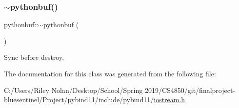 \mbox{\label{classpythonbuf_a3f1ff4b8d6c45c702a64251a0212a79c}} 
\subsubsection{\texorpdfstring{$\sim$pythonbuf()}{~pythonbuf()}}
{\footnotesize\ttfamily pythonbuf\+::$\sim$pythonbuf (\begin{DoxyParamCaption}{ }\end{DoxyParamCaption})\hspace{0.3cm}{\ttfamily [inline]}}



Sync before destroy. 



The documentation for this class was generated from the following file\+:\begin{DoxyCompactItemize}
\item 
C\+:/\+Users/\+Riley Nolan/\+Desktop/\+School/\+Spring 2019/\+C\+S4850/git/finalproject-\/bluesentinel/\+Project/pybind11/include/pybind11/\mbox{\hyperlink{iostream_8h}{iostream.\+h}}\end{DoxyCompactItemize}
